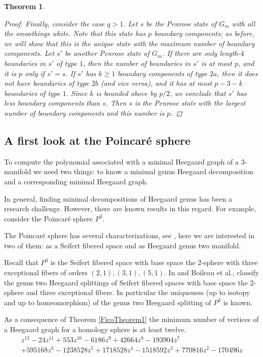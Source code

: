 \documentclass[pdflatex,sn-mathphys-num]{sn-jnl}%
\theoremstyle{plain}
\newtheorem{theorem}{Theorem}
\theoremstyle{definition}
\theoremstyle{remark}
\begin{document}
\begin{theorem}
\begin{proof}
Finally, consider the case $q>1$. Let $s$ be the Penrose state of $G_m$ with all the smoothings white. Note that this state has $p$ boundary components; as before, we will show that this is the unique state with the maximum number of boundary components. Let $s'$ be another Penrose state of $G_m$. If there are only length-$4$ boundaries in $s'$ of type $1$, then the number of boundaries in $s'$ is at most $p$, and it is $p$ only if $s'=s$. If $s'$ has $k\geq 1$ boundary components of type $2a$, then it does not have boundaries of type $2b$ (and vice versa), and it has at most $p-3-k$ boundaries of type $1$. Since $k$ is bounded above by $p/2$, we conclude that $s'$ has less boundary components than $s$. Then $s$ is the Penrose state with the largest number of boundary components and this number is $p$.  
\end{proof}
\end{theorem}

\subsection{A first look at the Poincaré sphere}\label{subsec:Poincare}

To compute the polynomial associated with a minimal Heegaard graph of a 3-manifold we need two things: to know a minimal genus Heegaard decomposition and a corresponding minimal Heegaard graph.

In general, finding minimal decompositions of Heegaard genus has been a research challenge. However, there are known results in this regard. For example, consider the Poincaré sphere $P^3$.

The Poincaré sphere has several characterizations, see \cite{KSch}, here we are interested in two of them: as a Seifert fibered space and as Heegaard genus two manifold.

Recall that $P^3$ is the Seifert fibered space with base space the 2-sphere with three exceptional fibers of orders $(2,1), (3,1), (5,1)$. In \cite{BoileauCollinsZieschang} and \cite{BoileauOtal} Boileau et al., classify the genus two Heegaard splittings of  Seifert fibered spaces with base space the 2-sphere and three exceptional fibers. In particular the uniqueness (up to isotopy and up to homeomorphism) of the genus two Heegaard splitting of $P^3$ is known. 


As a consequence of Theorem \ref{FicoTheorem1} the minimum number of vertices of a Heegaard graph for a homology sphere is at least twelve. 
\begin{multline*}
z^{12} - 24z^{11} + 553z^{10} - 6186z^{9} + 42664z^{8} - 193904z^{7} \\
+ 595168z^{6} - 1238528z^{5} + 1718528z^{4} - 1518592z^{3} + 770816z^{2} - 170496z
\end{multline*}
\end{document}
